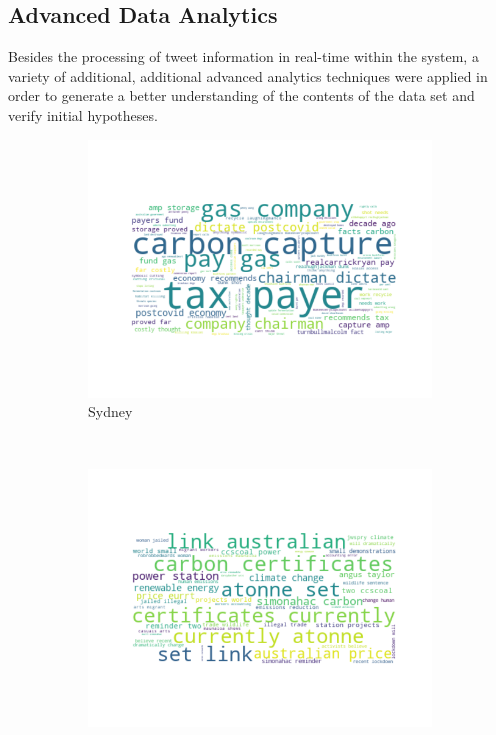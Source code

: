 \documentclass[11pt, oneside]{article}
\begin{document}
\subsection{Advanced Data Analytics}
\label{sec:advanced_data_analytics}
Besides the processing of tweet information in real-time within the system, a variety of additional, additional advanced analytics techniques were applied in order to generate a better understanding of the contents of the data set and verify initial hypotheses. 
\begin{figure}
    \centering
    \begin{subfigure}[b]{0.3\textwidth}
        \includegraphics[width=\textwidth]{figures/sydney_word_cloud.png}
        \caption{Sydney}
    \end{subfigure}
    ~ %
    \begin{subfigure}[b]{0.3\textwidth}
        \includegraphics[width=\textwidth]{figures/melbourne_word_cloud.png}

\end{subfigure}
\end{figure}
\end{document}
